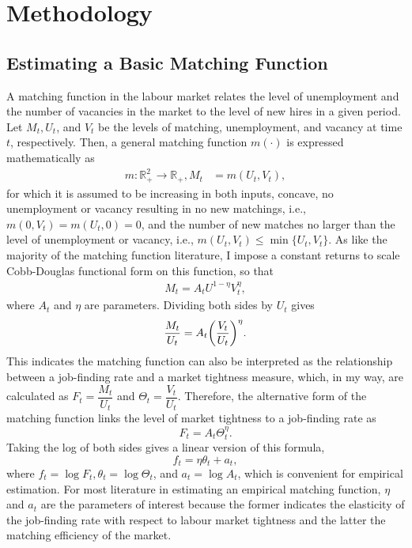 \documentclass[a4paper, 11pt, tikz]{article}
\begin{document}
\section{Methodology\label{methodology}}

\subsection{Estimating a Basic Matching Function}
A matching function in the labour market relates the level of unemployment and the number of vacancies in the market to the level of new hires in a given period.
Let $M_t, U_t$, and $V_t$ be the levels of matching, unemployment, and vacancy at time $t$, respectively.
Then, a general matching function $m(\cdot)$ is expressed mathematically as
\begin{align}
  m: \mathbb{R}_+^2 \to \mathbb{R}_+, M_t &= m(U_t, V_t),
\end{align}
for which it is assumed to be increasing in both inputs, concave, no unemployment or vacancy resulting in no new matchings, i.e., $m(0, V_t) = m(U_t, 0) = 0$, and the number of new matches no larger than the level of unemployment or vacancy, i.e., $m(U_t, V_t) \leq \min\{U_t, V_t\}$.
As like the majority of the matching function literature, I impose a constant returns to scale Cobb-Douglas functional form on this function, so that
\begin{align}
  M_t = A_tU^{1-\eta}V_t^\eta,
\end{align}
where $A_t$ and $\eta$ are parameters.
Dividing both sides by $U_t$ gives
\begin{equation}
  \frac{M_t}{U_t} = A_t\qty(\frac{V_t}{U_t})^\eta.
\end{equation}
This indicates the matching function can also be interpreted as the relationship between a job-finding rate and a market tightness measure, which, in my way, are calculated as $F_t = \dfrac{M_t}{U_t}$ and $\Theta_t = \dfrac{V_t}{U_t}$.
Therefore, the alternative form of the matching function links the level of market tightness to a job-finding rate as
\begin{equation}
  F_t = A_t\Theta_t^\eta.
\end{equation}
Taking the log of both sides gives a linear version of this formula,
\begin{equation}
  f_t = \eta\theta_t + a_t,
\end{equation}
where $f_t = \log F_t, \theta_t = \log\Theta_t$, and $a_t = \log A_t$, which is convenient for empirical estimation.
For most literature in estimating an empirical matching function, $\eta$ and $a_t$ are the parameters of interest because the former indicates the elasticity of the job-finding rate with respect to labour market tightness and the latter the matching efficiency of the market.
\end{document}
